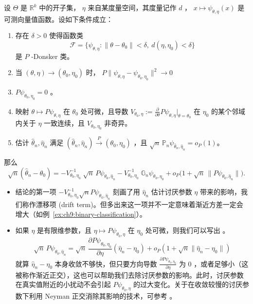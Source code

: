 \begin{theorem}\label{thm:ch9:z-estimator-with-nuisance}

设 $\Theta$ 是 $\mathbb R^k$ 中的开子集， $\eta$ 来自某度量空间，其度量记作 $d$ ， $x\mapsto \psi_{\theta,\eta}(x)$ 是可测向量值函数。设如下条件成立：

\begin{enumerate}
\def\labelenumi{\arabic{enumi}.}
\tightlist
\item
  存在 $\delta>0$ 使得函数类\[ \mathscr{F} = \bigl\{ \psi_{\theta,\eta} : \|\theta-\theta_0\|<\delta,\ d(\eta,\eta_0)<\delta \bigr\} \]是 $P$ -Donsker 类。
\item
  当 $(\theta,\eta)\to(\theta_0,\eta_0)$ 时， $P\bigl\| \psi_{\theta,\eta} - \psi_{\theta_0,\eta_0} \bigr\|^2 \to 0$
\item
  $P\psi_{\theta_0,\eta_0}=0$ 。
\item
  映射 $\theta \mapsto P\psi_{\theta,\eta}$ 在 $\theta_0$ 处可微，且导数 $V_{\theta_0,\eta} := \frac{\partial}{\partial\theta} P\psi_{\theta,\eta}\big|_{\theta=\theta_0}$ 在 $\eta_0$ 的某个邻域内关于 $\eta$ 一致连续，且 $V_{\theta_0,\eta_0}$ 非奇异。
\item
  估计 $\widehat\theta_n,\widehat\eta_n$ 满足 $(\widehat{\theta}_n,\widehat{\eta}_n) \overset{P}{\to} (\theta_0,\eta_0)$ ，且 $\sqrt{n}\,\mathbb{P}_n\psi_{\widehat{\theta}_n,\widehat{\eta}_n} = o_P(1)$。
\end{enumerate}

那么\[\sqrt{n}(\widehat{\theta}_n - \theta_0) = -V_{\theta_0,\eta_0}^{-1}\; \sqrt{n}\, P\psi_{\theta_0,\widehat{\eta}_n} - V_{\theta_0,\eta_0}^{-1}\; \mathbb{G}_n \psi_{\theta_0,\eta_0} + o_P\!\bigl(1 + \sqrt{n}\,\|P\psi_{\theta_0,\widehat{\eta}_n}\|\bigr).\]
\end{theorem}

\begin{remark}

\begin{itemize}
\tightlist
\item
  结论的第一项 $-V_{\theta_0,\eta_0}^{-1} \sqrt{n} P\psi_{\theta_0,\widehat{\eta}_n}$ 刻画了用 $\widehat\eta_n$ 估计讨厌参数 $\eta$ 带来的影响，我们称作漂移项 (drift term)。但多出来这一项并不一定意味着渐近方差一定会增大（如例~\ref{ex:ch9:binary-classification}）。
\item
  如果 $\eta$ 是有限维参数，且 $\eta \mapsto P\psi_{\theta_0,\eta}$ 在 $\eta_0$ 处可微，则我们可以写出 。\[ \sqrt{n}\,P\psi_{\theta_0,\widehat{\eta}_n} = \sqrt{n}\, \frac{\partial P\psi_{\theta_0,\eta_0}}{\partial\eta} (\widehat{\eta}_n-\eta_0) + o_P(1 + \sqrt{n}\|\widehat{\eta}_n-\eta_0\|) \]就算 $\widehat\eta_n-\eta_0$ 本身收敛不够快，但只要方向导数 $\frac{\partial P\psi_{\theta_0,\eta_0}}{\partial\eta}$ 为 0 ，或者足够小（这被称作渐近正交），这也可以帮助我们去除讨厌参数的影响。此时，讨厌参数在真实值附近的小扰动不会引起 $P\psi_{\theta_0,\eta}$ 的过大变化。关于在收敛较慢的讨厌参数下利用 Neyman 正交消除其影响的技术，可参考 \cite{chernozhukov2018}。
\end{itemize}
\end{remark}

